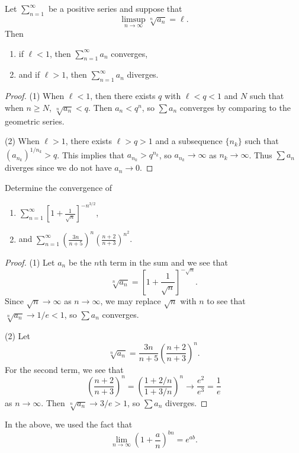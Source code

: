 \begin{theorem}
  Let $\sum_{n = 1}^\infty$ be a positive series and
  suppose that
  \[\limsup_{n \to \infty} \sqrt[n]{a_n} = \ell.\]
  Then
  \begin{enumerate}
    \item if $\ell < 1$, then $\sum_{n = 1}^\infty a_n$ converges,
    \item and if $\ell > 1$, then $\sum_{n = 1}^\infty a_n$ diverges.
  \end{enumerate}
\end{theorem}

\begin{proof}
  (1) When $\ell < 1$, then there exists $q$ with
  $\ell < q < 1$ and $N$ such that when $n \ge N$,
  $\sqrt[n]{a_n} < q$. Then $a_n < q^n$,
  so $\sum a_n$ converges by comparing to the
  geometric series.

  (2) When $\ell > 1$, there exists $\ell > q > 1$ and
  a subsequence $\{n_k\}$ such that
  $(a_{n_k})^{1 / n_k} > q$. This implies that
  $a_{n_k} > q^{n_k}$, so $a_{n_k} \to \infty$ as
  $n_k \to \infty$. Thus $\sum a_n$ diverges since
  we do not have $a_n \to 0$.
\end{proof}

\begin{example}
  Determine the convergence of
  \begin{enumerate}
    \item $\displaystyle \sum_{n =1 }^\infty \left[1 + \frac{1}{\sqrt{n}}\right]^{-n^{3 / 2}}$,
    \item and $\displaystyle \sum_{n = 1}^\infty \left(\frac{3n}{n + 5}\right)^n \left(\frac{n + 2}{n + 3}\right)^{n^2}$.
  \end{enumerate}
\end{example}

\begin{proof}
  (1) Let $a_n$ be the $n$th term in the sum and we
  see that
  \[
    \sqrt[n]{a_n} =
    \left[1 + \frac{1}{\sqrt{n}}\right]^{-\sqrt{n}}.
  \]
  Since $\sqrt{n} \to \infty$ as $n \to \infty$, we
  may replace $\sqrt{n}$ with $n$ to see that
  $\sqrt[n]{a_n} \to 1 / e < 1$, so
  $\sum a_n$ converges.

  (2) Let
  \[
    \sqrt[n]{a_n} = \frac{3n}{n + 5} \left(\frac{n + 2}{n + 3}\right)^n.
  \]
  For the second term, we see that
  \[
    \left(\frac{n + 2}{n + 3}\right)^n
    = \left(\frac{1 + 2 / n}{1 + 3 / n}\right)^n
    \longrightarrow \frac{e^2}{e^3} = \frac{1}{e}
  \]
  as $n \to \infty$.
  Then $\sqrt[n]{a_n} \to 3 / e > 1$, so
  $\sum a_n$ diverges.
\end{proof}

\begin{remark}
  In the above, we used the fact that
  \[
    \lim_{n \to \infty} \left(1 + \frac{a}{n}\right)^{bn}
    = e^{ab}.
  \]
\end{remark}
